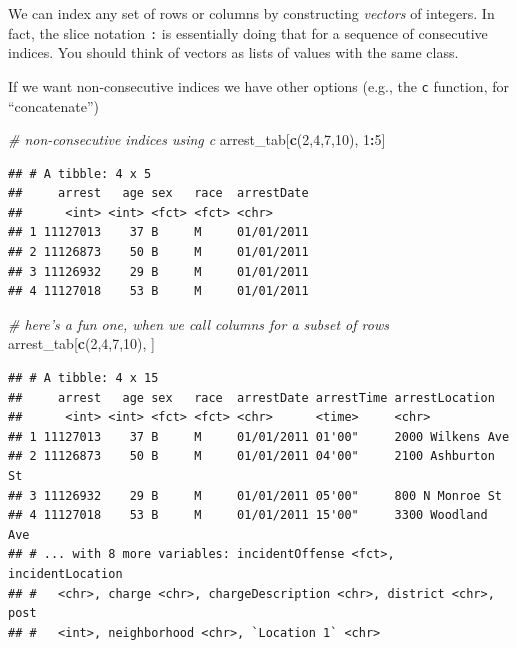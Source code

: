 \documentclass[12pt,]{book}
\newenvironment{Shaded}{\begin{snugshade}}{\end{snugshade}}
\newcommand{\KeywordTok}[1]{\textcolor[rgb]{0.13,0.29,0.53}{\textbf{#1}}}
\newcommand{\DecValTok}[1]{\textcolor[rgb]{0.00,0.00,0.81}{#1}}
\newcommand{\CommentTok}[1]{\textcolor[rgb]{0.56,0.35,0.01}{\textit{#1}}}
\newcommand{\OperatorTok}[1]{\textcolor[rgb]{0.81,0.36,0.00}{\textbf{#1}}}
\newcommand{\NormalTok}[1]{#1}
\theoremstyle{definition}
\theoremstyle{definition}
\theoremstyle{definition}
\theoremstyle{remark}
\begin{document}
We can index any set of rows or columns by constructing \emph{vectors}
of integers. In fact, the slice notation \texttt{:} is essentially doing
that for a sequence of consecutive indices. You should think of vectors
as lists of values with the same class.

If we want non-consecutive indices we have other options (e.g., the
\texttt{c} function, for ``concatenate'')

\begin{Shaded}
\begin{Highlighting}[]
\CommentTok{# non-consecutive indices using c}
\NormalTok{arrest_tab[}\KeywordTok{c}\NormalTok{(}\DecValTok{2}\NormalTok{,}\DecValTok{4}\NormalTok{,}\DecValTok{7}\NormalTok{,}\DecValTok{10}\NormalTok{), }\DecValTok{1}\OperatorTok{:}\DecValTok{5}\NormalTok{]}
\end{Highlighting}
\end{Shaded}

\begin{verbatim}
## # A tibble: 4 x 5
##     arrest   age sex   race  arrestDate
##      <int> <int> <fct> <fct> <chr>     
## 1 11127013    37 B     M     01/01/2011
## 2 11126873    50 B     M     01/01/2011
## 3 11126932    29 B     M     01/01/2011
## 4 11127018    53 B     M     01/01/2011
\end{verbatim}

\begin{Shaded}
\begin{Highlighting}[]
\CommentTok{# here's a fun one, when we call columns for a subset of rows}
\NormalTok{arrest_tab[}\KeywordTok{c}\NormalTok{(}\DecValTok{2}\NormalTok{,}\DecValTok{4}\NormalTok{,}\DecValTok{7}\NormalTok{,}\DecValTok{10}\NormalTok{), ]}
\end{Highlighting}
\end{Shaded}

\begin{verbatim}
## # A tibble: 4 x 15
##     arrest   age sex   race  arrestDate arrestTime arrestLocation   
##      <int> <int> <fct> <fct> <chr>      <time>     <chr>            
## 1 11127013    37 B     M     01/01/2011 01'00"     2000 Wilkens Ave 
## 2 11126873    50 B     M     01/01/2011 04'00"     2100 Ashburton St
## 3 11126932    29 B     M     01/01/2011 05'00"     800 N Monroe St  
## 4 11127018    53 B     M     01/01/2011 15'00"     3300 Woodland Ave
## # ... with 8 more variables: incidentOffense <fct>, incidentLocation
## #   <chr>, charge <chr>, chargeDescription <chr>, district <chr>, post
## #   <int>, neighborhood <chr>, `Location 1` <chr>
\end{verbatim}
\end{document}
